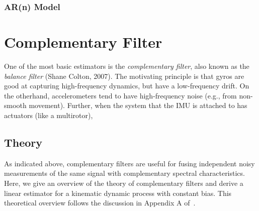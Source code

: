 \documentclass[a4paper]{article}
\begin{document}
\subsubsection*{AR(n) Model}

\section*{Complementary Filter}
One of the most basic estimators is the \textit{complementary filter}, also known as the \textit{balance filter} (Shane Colton, 2007).
The motivating principle is that gyros are good at capturing high-frequency dynamics, but have a low-frequency drift.
On the otherhand, accelerometers tend to have high-frequency noise (e.g., from non-smooth movement).
Further, when the system that the IMU is attached to has actuators (like a multirotor), 

\subsection*{Theory}
As indicated above, complementary filters are useful for fusing independent noisy measurements of the same signal with complementary spectral characteristics.
Here, we give an overview of the theory of complementary filters and derive a linear estimator for a kinematic dynamic process with constant bias.
This theoretical overview follows the discussion in Appendix A of~\citet{Mahony2008}.
\end{document}
